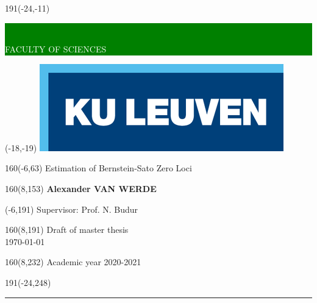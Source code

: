 \thispagestyle{empty}
\newcommand{\form}[1]{\scalebox{1.087}{\boldmath{#1}}}
\sffamily
%
\begin{textblock}{191}(-24,-11)
\colorbox{green}{\hspace{123mm}\ \parbox[c][18truemm]{68mm}{\textcolor{white}{FACULTY OF SCIENCES}}}
\end{textblock}
%
\begin{textblock}{70}(-18,-19)
\textblockcolour{}
\includegraphics*[height=19.8truemm]{Figures/LogoKULeuven}
\end{textblock}
%
\begin{textblock}{160}(-6,63)
\textblockcolour{}
\vspace{-\parskip}
\flushleft
\fontsize{40}{42}\selectfont \textcolor{bluetitle}{Estimation of Bernstein-Sato Zero Loci}\\[1.5mm]
\end{textblock}
%
%
\begin{textblock}{160}(8,153)
\textblockcolour{}
\vspace{-\parskip}
\flushright
\fontsize{14}{16}\selectfont \textbf{Alexander VAN WERDE}
\end{textblock}
%
\begin{textblock}{70}(-6,191)
\textblockcolour{}
\vspace{-\parskip}
\flushleft
Supervisor: Prof. N. Budur
\end{textblock}
%
\begin{textblock}{160}(8,191)
\textblockcolour{}
\vspace{-\parskip}
\flushright
Draft of master thesis \\[4.5pt]
\today
\end{textblock}
%
\begin{textblock}{160}(8,232)
\textblockcolour{}
\vspace{-\parskip}
\flushright
Academic year 2020-2021
\end{textblock}
%
\begin{textblock}{191}(-24,248)
{\color{blueline}\rule{550pt}{5.5pt}}
\end{textblock}
%
\vfill
